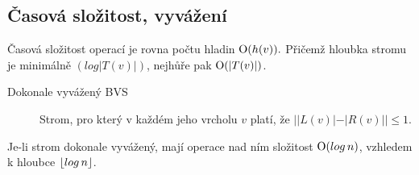   \subsection{Časová složitost, vyvážení}
  Časová složitost operací je rovna počtu hladin $\textrm O(h(v)).$ Přičemž hloubka stromu je minimálně $(log|T(v)|)$,
  nejhůře pak $\textrm O(|T(v)|)$.

  \begin{description}
    \item[Dokonale vyvážený BVS] Strom, pro který v každém jeho vrcholu $v$ platí, že $||L(v)| - |R(v)|| ≤ 1$.
  \end{description}

  Je-li strom dokonale vyvážený, mají operace nad ním složitost $\textrm O(log \, n)$, vzhledem k hloubce $\lfloor log \, n\rfloor$.

